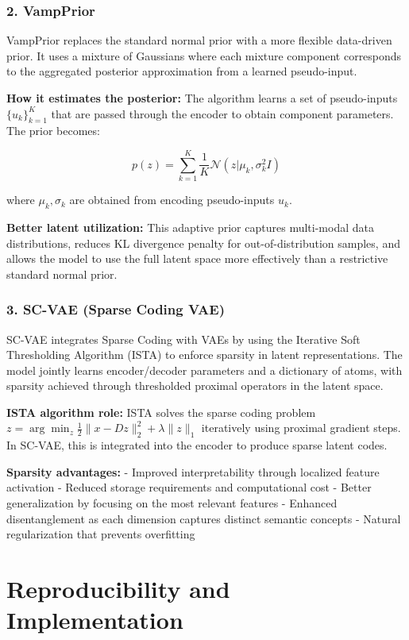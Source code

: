 \documentclass[conference]{IEEEtran}
\begin{document}
\subsubsection{2. VampPrior}

VampPrior replaces the standard normal prior with a more flexible data-driven prior. It uses a mixture of Gaussians where each mixture component corresponds to the aggregated posterior approximation from a learned pseudo-input.

\textbf{How it estimates the posterior:} The algorithm learns a set of pseudo-inputs $\{u_k\}_{k=1}^K$ that are passed through the encoder to obtain component parameters. The prior becomes:

\[p(z) = \sum_{k=1}^K \frac{1}{K} \mathcal{N}(z | \mu_k, \sigma_k^2 I)\]

where $\mu_k, \sigma_k$ are obtained from encoding pseudo-inputs $u_k$.

\textbf{Better latent utilization:} This adaptive prior captures multi-modal data distributions, reduces KL divergence penalty for out-of-distribution samples, and allows the model to use the full latent space more effectively than a restrictive standard normal prior.

\subsubsection{3. SC-VAE (Sparse Coding VAE)}

SC-VAE integrates Sparse Coding with VAEs by using the Iterative Soft Thresholding Algorithm (ISTA) to enforce sparsity in latent representations. The model jointly learns encoder/decoder parameters and a dictionary of atoms, with sparsity achieved through thresholded proximal operators in the latent space.

\textbf{ISTA algorithm role:} ISTA solves the sparse coding problem $z = \arg\min_z \frac{1}{2}\|x - Dz\|_2^2 + \lambda\|z\|_1$ iteratively using proximal gradient steps. In SC-VAE, this is integrated into the encoder to produce sparse latent codes.

\textbf{Sparsity advantages:}
- Improved interpretability through localized feature activation
- Reduced storage requirements and computational cost
- Better generalization by focusing on the most relevant features
- Enhanced disentanglement as each dimension captures distinct semantic concepts
- Natural regularization that prevents overfitting

\section{Reproducibility and Implementation}
\end{document}
